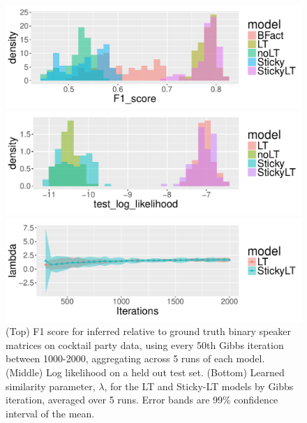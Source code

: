 \begin{figure}[tb]
\vskip 0.2in
\begin{center}
  \centerline{\includegraphics[width = \columnwidth]{fig/cocktail_old/F1_score_density.pdf}}
  \centerline{\includegraphics[width = \columnwidth]{fig/cocktail_old/test_log_likelihood_density.pdf}}
  \centerline{\includegraphics[width = \columnwidth]{fig/cocktail_old/lambda.pdf}}
\caption{(Top) F1 score for inferred relative to ground
  truth binary speaker matrices on cocktail party data, using 
  every 50th Gibbs iteration between 1000-2000, aggregating across 5
  runs of each model. (Middle) Log likelihood on a held out test set.
  (Bottom) Learned similarity parameter, $\lambda$, for the LT and Sticky-LT
  models by Gibbs iteration, averaged over 5 runs.  Error bands are
  99\% confidence interval of the mean.}
\end{center}
\label{fig:cocktail-metrics}
\vskip 0.2in
\end{figure}

